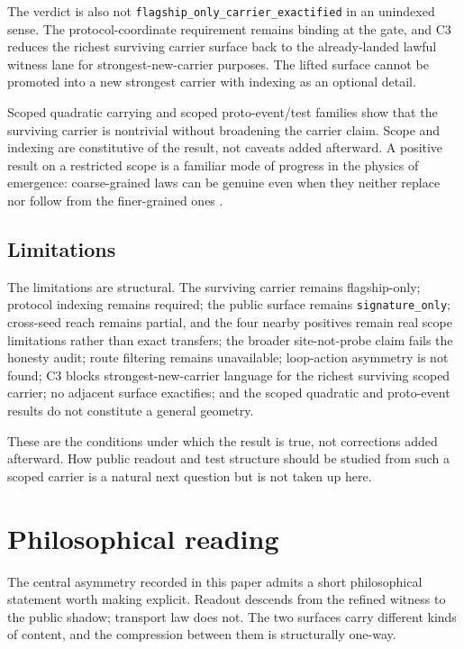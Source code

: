 \documentclass[11pt]{article}
\theoremstyle{definition}
\begin{document}
The verdict is also not \texttt{flagship\_only\_carrier\_exactified} in an unindexed
sense. The protocol-coordinate requirement remains binding at the gate, and C3
reduces the richest surviving carrier surface back to the already-landed lawful
witness lane for strongest-new-carrier purposes. The lifted surface cannot be
promoted into a new strongest carrier with indexing as an optional detail.

Scoped quadratic carrying and scoped proto-event/test families show that the
surviving carrier is nontrivial without broadening the carrier claim. Scope and
indexing are constitutive of the result, not caveats added afterward. A positive
result on a restricted scope is a familiar mode of progress in the physics of
emergence: coarse-grained laws can be genuine even when they neither replace nor
follow from the finer-grained ones \citep{Butterfield2011}.

\subsection{Limitations}

The limitations are structural. The surviving carrier remains flagship-only; protocol
indexing remains required; the public surface remains \texttt{signature\_only};
cross-seed reach remains partial, and the four nearby positives remain real scope
limitations rather than exact transfers; the broader site-not-probe claim fails the
honesty audit; route filtering remains unavailable; loop-action asymmetry is not
found; C3 blocks strongest-new-carrier language for the richest surviving scoped
carrier; no adjacent surface exactifies; and the scoped quadratic and proto-event
results do not constitute a general geometry.

These are the conditions under which the result is true, not corrections added
afterward. How public readout and test structure should be studied from such a
scoped carrier is a natural next question but is not taken up here.
 \section{Philosophical reading}
\label{sec:philosophical-reading}

The central asymmetry recorded in this paper admits a short philosophical
statement worth making explicit. Readout descends from the refined witness to
the public shadow; transport law does not. The two surfaces carry different
kinds of content, and the compression between them is structurally one-way.
\end{document}
